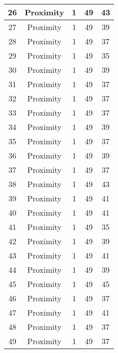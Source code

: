 \documentclass[results.tex]{subfiles}
\begin{document}
\begin{center}
\begin{tabular}{| c || c | c | c | c |}
    \hline
    26 & Proximity & 1 & 49 & 43 \\ 
    \hline
    27 & Proximity & 1 & 49 & 39 \\ 
    \hline
    28 & Proximity & 1 & 49 & 37 \\ 
    \hline
    29 & Proximity & 1 & 49 & 35 \\ 
    \hline
    30 & Proximity & 1 & 49 & 39 \\ 
    \hline
    31 & Proximity & 1 & 49 & 37 \\ 
    \hline
    32 & Proximity & 1 & 49 & 37 \\ 
    \hline
    33 & Proximity & 1 & 49 & 37 \\ 
    \hline
    34 & Proximity & 1 & 49 & 39 \\ 
    \hline
    35 & Proximity & 1 & 49 & 37 \\ 
    \hline
    36 & Proximity & 1 & 49 & 39 \\ 
    \hline
    37 & Proximity & 1 & 49 & 37 \\ 
    \hline
    38 & Proximity & 1 & 49 & 43 \\ 
    \hline
    39 & Proximity & 1 & 49 & 41 \\ 
    \hline
    40 & Proximity & 1 & 49 & 41 \\ 
    \hline
    41 & Proximity & 1 & 49 & 35 \\ 
    \hline
    42 & Proximity & 1 & 49 & 39 \\ 
    \hline
    43 & Proximity & 1 & 49 & 41 \\ 
    \hline
    44 & Proximity & 1 & 49 & 39 \\ 
    \hline
    45 & Proximity & 1 & 49 & 45 \\ 
    \hline
    46 & Proximity & 1 & 49 & 37 \\ 
    \hline
    47 & Proximity & 1 & 49 & 41 \\ 
    \hline
    48 & Proximity & 1 & 49 & 37 \\ 
    \hline
    49 & Proximity & 1 & 49 & 37 \\ 
    \hline   \end{tabular}
\end{center}
\end{document}
